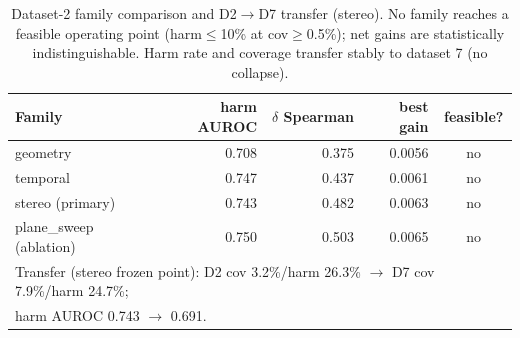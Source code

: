 \begin{table}[t]
\centering
\caption{Dataset-2 family comparison and D2$\rightarrow$D7 transfer (stereo).
No family reaches a feasible operating point (harm$\leq$10\% at cov$\geq$0.5\%);
net gains are statistically indistinguishable. Harm rate and coverage transfer
stably to dataset 7 (no collapse).}
\label{tab:families}
\begin{tabular}{lrrrc}
\toprule
Family & harm AUROC & $\delta$ Spearman & best gain & feasible? \\
\midrule
geometry     & 0.708 & 0.375 & 0.0056 & no \\
temporal     & 0.747 & 0.437 & 0.0061 & no \\
stereo (primary) & 0.743 & 0.482 & 0.0063 & no \\
plane\_sweep (ablation) & 0.750 & 0.503 & 0.0065 & no \\
\midrule
\multicolumn{5}{l}{Transfer (stereo frozen point): D2 cov 3.2\%/harm 26.3\% $\rightarrow$ D7 cov 7.9\%/harm 24.7\%;} \\
\multicolumn{5}{l}{harm AUROC 0.743 $\rightarrow$ 0.691.} \\
\bottomrule
\end{tabular}
\end{table}
